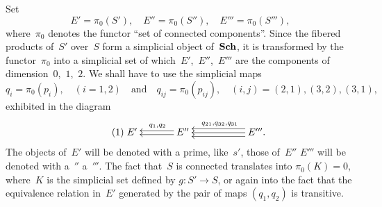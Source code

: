 Set
$$
E'=\pi_0(S'), \quad E''=\pi_0(S''), \quad E'''=\pi_0(S'''),
$$
where~$\pi_0$ denotes the functor ``set of connected components''.
Since the fibered products of~$S'$ over~$S$ form a simplicial object
of~$\mathbf{Sch}$, it is transformed by the functor~$\pi_0$ into a simplicial
set of which~$E'$,~$E''$,~$E'''$ are the components of
dimension~$0$,~$1$,~$2$. We shall have to use the simplicial maps
$$
q_i=\pi_0(p_i),\quad(i=1,2)\quad\text{and}
\quad q_{ij}=\pi_0(p_{ij}),\quad (i,j)=(2,1),(3,2),(3,1),
$$
exhibited in the diagram
\begin{equation*}
\label{eq:IX.5.1}
\tag{1} {\xymatrix@C=.5cm{ E' && \ar@<2pt>[ll] \ar@<-2pt>[ll]_{q_1,q_2} E'' &&&
\ar@<4pt>[lll] \ar[lll] \ar@<-4pt>[lll]_{q_{21},q_{32},q_{31}} E'''. }}
\end{equation*}
The objects
of~$E'$ will be denoted with a prime, like~$s'$, those of~$E''$
\resp $E'''$ will be denoted with a~$''$ \resp a~$'''$. The fact
that~$S$ is connected translates into $\pi_0(K)=0$, where~$K$ is the
simplicial set defined by $g\colon S'\to S$, or again into the fact
that the equivalence relation in~$E'$ generated by the pair of maps
$(q_1,q_2)$ is transitive.

